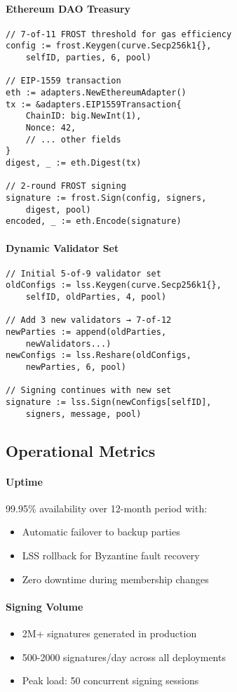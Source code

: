 \documentclass[11pt,twocolumn]{article}
\begin{document}
\paragraph{Ethereum DAO Treasury}
\begin{verbatim}
// 7-of-11 FROST threshold for gas efficiency
config := frost.Keygen(curve.Secp256k1{},
    selfID, parties, 6, pool)

// EIP-1559 transaction
eth := adapters.NewEthereumAdapter()
tx := &adapters.EIP1559Transaction{
    ChainID: big.NewInt(1),
    Nonce: 42,
    // ... other fields
}
digest, _ := eth.Digest(tx)

// 2-round FROST signing
signature := frost.Sign(config, signers,
    digest, pool)
encoded, _ := eth.Encode(signature)
\end{verbatim}

\paragraph{Dynamic Validator Set}
\begin{verbatim}
// Initial 5-of-9 validator set
oldConfigs := lss.Keygen(curve.Secp256k1{},
    selfID, oldParties, 4, pool)

// Add 3 new validators → 7-of-12
newParties := append(oldParties,
    newValidators...)
newConfigs := lss.Reshare(oldConfigs,
    newParties, 6, pool)

// Signing continues with new set
signature := lss.Sign(newConfigs[selfID],
    signers, message, pool)
\end{verbatim}

\subsection{Operational Metrics}

\paragraph{Uptime} 99.95\% availability over 12-month period with:
\begin{itemize}
\item Automatic failover to backup parties
\item LSS rollback for Byzantine fault recovery
\item Zero downtime during membership changes
\end{itemize}

\paragraph{Signing Volume}
\begin{itemize}
\item 2M+ signatures generated in production
\item 500-2000 signatures/day across all deployments
\item Peak load: 50 concurrent signing sessions
\end{itemize}
\end{document}
